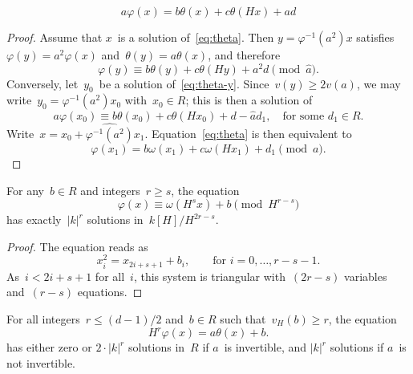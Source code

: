\documentclass{llncs}
\def\abs#1{\left|#1\right|}
\begin{document}
\begin{equation}\label{eq:theta}
a φ(x) = b θ(x) + c θ(Hx) + ad
\end{equation}

\begin{proof}
Assume that $x$~is a solution of~\eqref{eq:theta}. Then $y = φ^{-1}(a^2)
x$ satisfies~$φ(y) = a^2 φ(x)$ and~$θ(y) = a θ(x)$, and therefore
\begin{equation}\label{eq:theta-y}
φ(y) ≡ b θ(y) + c θ(Hy) + a^2d \pmod{\widehat{a}}.
\end{equation}
Conversely, let~$y_0$~be a solution of~\eqref{eq:theta-y}. Since~$v(y) ≥
2 v(a)$, we may write~$y_0 = φ^{-1}(a^2) x_0$ with~$x_0 ∈ R$; this is
then a solution of
\begin{equation}\label{eq:theta-x0}
a φ(x_0) ≡ b θ(x_0) + c θ(H x_0) + d - \widehat{a} d_1,\quad
\text{for some~$d_1 ∈ R$.}
\end{equation}
Write~$x = x_0 + \widehat{φ^{-1}(a^2)} x_1$. Equation~\eqref{eq:theta} is
then equivalent to
\begin{equation}\label{eq:omega-x1}
φ(x_1) = b ω(x_1) + c ω(H x_1) + d_1 \pmod{a}.
\end{equation}
\end{proof}

\begin{proposition}\label{prop:omega}
For any~$b ∈ R$ and integers~$r ≥ s$, the equation
\begin{equation}
φ(x) ≡ ω(H^s x) + b \pmod{H^{r - s}}
\end{equation}
has exactly~$\abs{k}^r$ solutions in~$k[H]/H^{2r-s}$.
\end{proposition}


\begin{proof}
The equation reads as
\begin{equation}
x_{i}^2 = x_{2i+s+1} + b_i, \qquad \text{for~$i = 0, …, r-s-1$}.
\end{equation}
As~$i < 2i+s+1$ for all~$i$, this system is triangular with~$(2r-s)$
variables and~$(r-s)$ equations.
\end{proof}


\begin{proposition}\label{prop:theta}
For all integers~$r ≤ (d-1)/2$ and~$b ∈ R$ such that~$v_H(b) ≥ r$,
the equation
\begin{equation}\label{eq:theta}
H^r φ(x) = a θ(x) + b.
\end{equation}
has either zero or $2·\abs{k}^{r}$ solutions in~$R$ if $a$~is invertible,
and $\abs{k}^r$ solutions if $a$~is not invertible.
\end{proposition}
\end{document}
